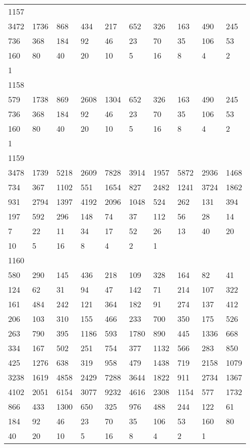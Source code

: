 \begin{longtable}{*{10}{l}}
1157&&&&&&&&&\\
3472& 1736& 868& 434& 217& 652& 326& 163& 490& 245\\
736& 368& 184& 92& 46& 23& 70& 35& 106& 53\\
160& 80& 40& 20& 10& 5& 16& 8& 4& 2\\
1& \\

1158&&&&&&&&&\\
579& 1738& 869& 2608& 1304& 652& 326& 163& 490& 245\\
736& 368& 184& 92& 46& 23& 70& 35& 106& 53\\
160& 80& 40& 20& 10& 5& 16& 8& 4& 2\\
1& \\

1159&&&&&&&&&\\
3478& 1739& 5218& 2609& 7828& 3914& 1957& 5872& 2936& 1468\\
734& 367& 1102& 551& 1654& 827& 2482& 1241& 3724& 1862\\
931& 2794& 1397& 4192& 2096& 1048& 524& 262& 131& 394\\
197& 592& 296& 148& 74& 37& 112& 56& 28& 14\\
7& 22& 11& 34& 17& 52& 26& 13& 40& 20\\
10& 5& 16& 8& 4& 2& 1& \\

1160&&&&&&&&&\\
580& 290& 145& 436& 218& 109& 328& 164& 82& 41\\
124& 62& 31& 94& 47& 142& 71& 214& 107& 322\\
161& 484& 242& 121& 364& 182& 91& 274& 137& 412\\
206& 103& 310& 155& 466& 233& 700& 350& 175& 526\\
263& 790& 395& 1186& 593& 1780& 890& 445& 1336& 668\\
334& 167& 502& 251& 754& 377& 1132& 566& 283& 850\\
425& 1276& 638& 319& 958& 479& 1438& 719& 2158& 1079\\
3238& 1619& 4858& 2429& 7288& 3644& 1822& 911& 2734& 1367\\
4102& 2051& 6154& 3077& 9232& 4616& 2308& 1154& 577& 1732\\
866& 433& 1300& 650& 325& 976& 488& 244& 122& 61\\
184& 92& 46& 23& 70& 35& 106& 53& 160& 80\\
40& 20& 10& 5& 16& 8& 4& 2& 1& \\


\end{longtable}

